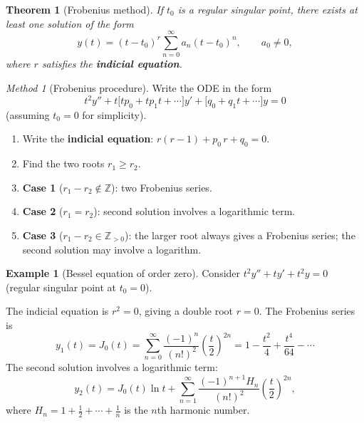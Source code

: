 \documentclass[12pt,a4paper,openany]{book}
\theoremstyle{definition}
\newtheorem{example}[definition]{Example}
\theoremstyle{plain}
\newtheorem{theorem}[definition]{Theorem}
\theoremstyle{remark}
\newtheorem{method}[definition]{Method}
\newcommand{\Z}{\mathbb{Z}}
\begin{document}
\begin{theorem}[Frobenius method]\label{thm:frobenius}
If $t_0$ is a regular singular point, there exists at least one solution
of the form
\begin{equation}\label{eq:frobenius-form}
  y(t) = (t-t_0)^r\sum_{n=0}^{\infty}a_n(t-t_0)^n, \qquad a_0\neq 0,
\end{equation}
where $r$ satisfies the \textbf{indicial equation}.
\end{theorem}

\begin{method}[Frobenius procedure]\label{meth:frobenius}
Write the ODE in the form
\[
  t^2y''+t\bigl[tp_0+tp_1t+\cdots\bigr]y'+\bigl[q_0+q_1t+\cdots\bigr]y=0
\]
(assuming $t_0=0$ for simplicity).
\begin{enumerate}[label=\textbf{Step \arabic*:}]
  \item Write the \textbf{indicial equation}:
    $r(r-1)+p_0\,r+q_0=0$.
  \item Find the two roots $r_1\ge r_2$.
  \item \textbf{Case 1} ($r_1-r_2\notin\Z$): two Frobenius series.
  \item \textbf{Case 2} ($r_1=r_2$): second solution involves a
    logarithmic term.
  \item \textbf{Case 3} ($r_1-r_2\in\Z_{>0}$): the larger root always
    gives a Frobenius series; the second solution may involve a logarithm.
\end{enumerate}
\end{method}

\begin{example}[Bessel equation of order zero]\label{ex:bessel-0}
Consider $t^2y''+ty'+t^2y=0$ (regular singular point at $t_0=0$).

The indicial equation is $r^2=0$, giving a double root $r=0$.
The Frobenius series is
\[
  y_1(t) = J_0(t) = \sum_{n=0}^{\infty}\frac{(-1)^n}{(n!)^2}
    \left(\frac{t}{2}\right)^{2n}
  = 1 - \frac{t^2}{4} + \frac{t^4}{64} - \cdots
\]
The second solution involves a logarithmic term:
\[
  y_2(t) = J_0(t)\ln t + \sum_{n=1}^{\infty}
    \frac{(-1)^{n+1}H_n}{(n!)^2}\left(\frac{t}{2}\right)^{2n},
\]
where $H_n=1+\frac{1}{2}+\cdots+\frac{1}{n}$ is the $n$th harmonic number.
\end{example}
\end{document}
